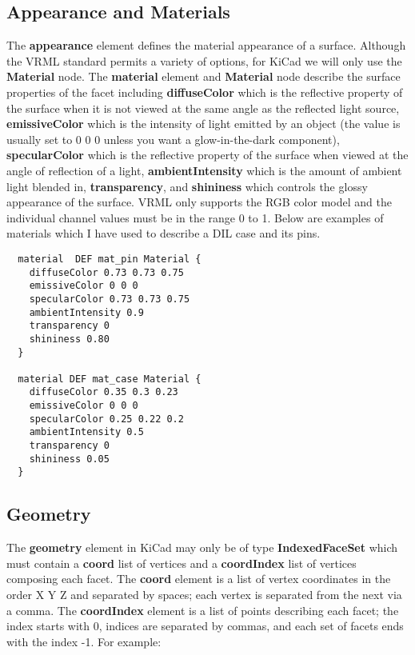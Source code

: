 \documentclass[a4paper]{article}
\begin{document}
\subsection{Appearance and Materials}
The \textbf{appearance} element defines the material appearance of a surface. Although the VRML
standard permits a variety of options, for KiCad we will only use the \textbf{Material} node.
The \textbf{material} element and \textbf{Material} node describe the surface properties of
the facet including \textbf{diffuseColor} which is the reflective property of the surface when it is
not viewed at the same angle as the reflected light source, \textbf{emissiveColor} which is the
intensity of light emitted by an object (the value is usually set to 0 0 0 unless you want
a glow-in-the-dark component), \textbf{specularColor} which is the reflective property of the
surface when viewed at the angle of reflection of a light, \textbf{ambientIntensity} which is the
amount of ambient light blended in, \textbf{transparency}, and \textbf{shininess} which
controls the glossy appearance of the surface. VRML only supports the RGB color model and the
individual channel values must be in the range 0 to 1. Below are examples of materials which I have used
to describe a DIL case and its pins.

\begin{verbatim}
  material  DEF mat_pin Material {
    diffuseColor 0.73 0.73 0.75
    emissiveColor 0 0 0
    specularColor 0.73 0.73 0.75
    ambientIntensity 0.9
    transparency 0
    shininess 0.80
  }

  material DEF mat_case Material {
    diffuseColor 0.35 0.3 0.23
    emissiveColor 0 0 0
    specularColor 0.25 0.22 0.2
    ambientIntensity 0.5
    transparency 0
    shininess 0.05
  }
\end{verbatim}

\subsection{Geometry}
The \textbf{geometry} element in KiCad may only be of type \textbf{IndexedFaceSet} which must contain a
\textbf{coord} list of vertices and a \textbf{coordIndex} list of vertices composing each facet.
The \textbf{coord} element is a list of vertex coordinates in the order X Y Z and separated by spaces;
each vertex is separated from the next via a comma. The \textbf{coordIndex} element is a list of points
describing each facet; the index starts with 0, indices are separated by commas, and each set of facets
ends with the index -1. For example:
\end{document}
